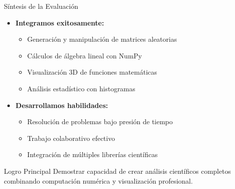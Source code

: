 \documentclass[10pt]{beamer}
\begin{document}
\begin{frame}{Síntesis de la Evaluación}
  \begin{itemize}
    \item \textbf{Integramos exitosamente:}
      \begin{itemize}
        \item Generación y manipulación de matrices aleatorias
        \item Cálculos de álgebra lineal con NumPy
        \item Visualización 3D de funciones matemáticas
        \item Análisis estadístico con histogramas
      \end{itemize}
    \item \textbf{Desarrollamos habilidades:}
      \begin{itemize}
        \item Resolución de problemas bajo presión de tiempo
        \item Trabajo colaborativo efectivo
        \item Integración de múltiples librerías científicas
      \end{itemize}
  \end{itemize}
  
  \begin{block}{Logro Principal}
    Demostrar capacidad de crear análisis científicos completos combinando computación numérica y visualización profesional.
  \end{block}
\end{frame}
\end{document}
